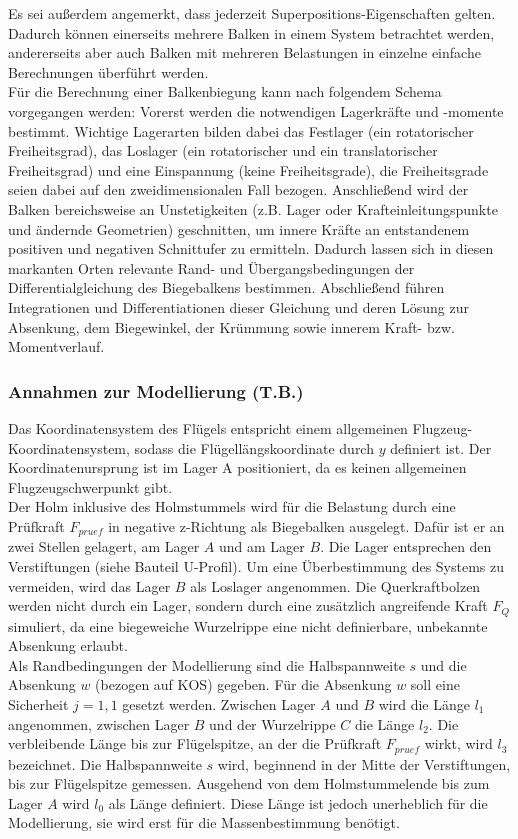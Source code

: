 \noindent Es sei außerdem angemerkt, dass jederzeit Superpositions-Eigenschaften gelten. Dadurch können einerseits mehrere Balken in einem System betrachtet werden, andererseits aber auch Balken mit mehreren Belastungen in einzelne einfache Berechnungen überführt werden.\\

\noindent Für die Berechnung einer Balkenbiegung kann nach folgendem Schema vorgegangen werden: Vorerst werden die notwendigen Lagerkräfte und -momente bestimmt. Wichtige Lagerarten bilden dabei das Festlager (ein rotatorischer Freiheitsgrad), das Loslager (ein rotatorischer und ein translatorischer Freiheitsgrad) und eine Einspannung (keine Freiheitsgrade), die Freiheitsgrade seien dabei auf den zweidimensionalen Fall bezogen. Anschließend wird der Balken bereichsweise an  Unstetigkeiten (z.B. Lager oder Krafteinleitungspunkte und ändernde Geometrien) geschnitten, um innere Kräfte an entstandenem positiven und negativen Schnittufer zu ermitteln. Dadurch lassen sich in diesen markanten Orten relevante Rand- und Übergangsbedingungen der Differentialgleichung des Biegebalkens bestimmen. Abschließend führen Integrationen und Differentiationen dieser Gleichung und deren Lösung  zur Absenkung, dem Biegewinkel, der Krümmung sowie innerem Kraft- bzw. Momentverlauf.


\subsubsection{Annahmen zur Modellierung (T.B.)}
Das Koordinatensystem des Flügels entspricht einem allgemeinen Flugzeug-Koordinatensystem, sodass die Flügellängskoordinate durch $y$ definiert ist. Der Koordinatenursprung ist im Lager A positioniert, da es keinen allgemeinen Flugzeugschwerpunkt gibt. \\

\noindent Der Holm inklusive des Holmstummels wird für die Belastung durch eine Prüfkraft $F_{pruef}$ in negative z-Richtung als Biegebalken ausgelegt. Dafür ist er an zwei Stellen gelagert, am Lager $A$ und am Lager $B$. Die Lager entsprechen den Verstiftungen (siehe Bauteil U-Profil). Um eine Überbestimmung des Systems zu vermeiden, wird das Lager $B$ als Loslager angenommen. Die Querkraftbolzen werden nicht durch ein Lager, sondern durch eine zusätzlich angreifende Kraft $F_{Q}$ simuliert, da eine biegeweiche Wurzelrippe eine nicht definierbare, unbekannte Absenkung erlaubt.\\

\noindent Als Randbedingungen der Modellierung sind die Halbspannweite $s$ und die Absenkung $w$ (bezogen auf KOS) gegeben. Für die Absenkung $w$ soll eine Sicherheit $j=1,1$ gesetzt werden. Zwischen Lager $A$ und $B$ wird die Länge $l_{1}$ angenommen, zwischen Lager $B$ und der Wurzelrippe $C$ die Länge $l_{2}$. Die verbleibende Länge bis zur Flügelspitze, an der die Prüfkraft $F_{pruef}$ wirkt, wird $l_{3}$ bezeichnet. Die Halbspannweite $s$ wird, beginnend in der Mitte der Verstiftungen, bis zur Flügelspitze gemessen. Ausgehend von dem Holmstummelende bis zum Lager $A$ wird $l_{0}$ als Länge definiert. Diese Länge ist jedoch unerheblich für die Modellierung, sie wird erst für die Massenbestimmung benötigt.\\

